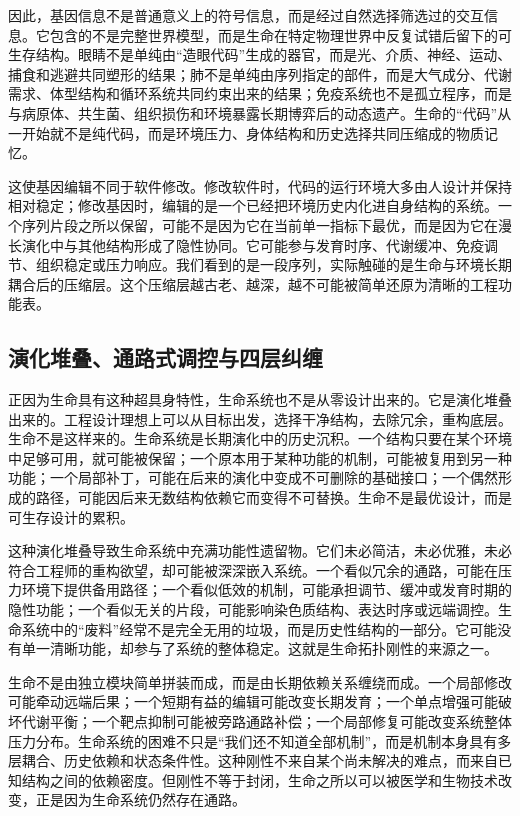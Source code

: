 因此，基因信息不是普通意义上的符号信息，而是经过自然选择筛选过的交互信息。它包含的不是完整世界模型，而是生命在特定物理世界中反复试错后留下的可生存结构。眼睛不是单纯由“造眼代码”生成的器官，而是光、介质、神经、运动、捕食和逃避共同塑形的结果；肺不是单纯由序列指定的部件，而是大气成分、代谢需求、体型结构和循环系统共同约束出来的结果；免疫系统也不是孤立程序，而是与病原体、共生菌、组织损伤和环境暴露长期博弈后的动态遗产。生命的“代码”从一开始就不是纯代码，而是环境压力、身体结构和历史选择共同压缩成的物质记忆。

这使基因编辑不同于软件修改。修改软件时，代码的运行环境大多由人设计并保持相对稳定；修改基因时，编辑的是一个已经把环境历史内化进自身结构的系统。一个序列片段之所以保留，可能不是因为它在当前单一指标下最优，而是因为它在漫长演化中与其他结构形成了隐性协同。它可能参与发育时序、代谢缓冲、免疫调节、组织稳定或压力响应。我们看到的是一段序列，实际触碰的是生命与环境长期耦合后的压缩层。这个压缩层越古老、越深，越不可能被简单还原为清晰的工程功能表。

\subsection{演化堆叠、通路式调控与四层纠缠}


正因为生命具有这种超具身特性，生命系统也不是从零设计出来的。它是演化堆叠出来的。工程设计理想上可以从目标出发，选择干净结构，去除冗余，重构底层。生命不是这样来的。生命系统是长期演化中的历史沉积。一个结构只要在某个环境中足够可用，就可能被保留；一个原本用于某种功能的机制，可能被复用到另一种功能；一个局部补丁，可能在后来的演化中变成不可删除的基础接口；一个偶然形成的路径，可能因后来无数结构依赖它而变得不可替换。生命不是最优设计，而是可生存设计的累积。

这种演化堆叠导致生命系统中充满功能性遗留物。它们未必简洁，未必优雅，未必符合工程师的重构欲望，却可能被深深嵌入系统。一个看似冗余的通路，可能在压力环境下提供备用路径；一个看似低效的机制，可能承担调节、缓冲或发育时期的隐性功能；一个看似无关的片段，可能影响染色质结构、表达时序或远端调控。生命系统中的“废料”经常不是完全无用的垃圾，而是历史性结构的一部分。它可能没有单一清晰功能，却参与了系统的整体稳定。这就是生命拓扑刚性的来源之一。

生命不是由独立模块简单拼装而成，而是由长期依赖关系缠绕而成。一个局部修改可能牵动远端后果；一个短期有益的编辑可能改变长期发育；一个单点增强可能破坏代谢平衡；一个靶点抑制可能被旁路通路补偿；一个局部修复可能改变系统整体压力分布。生命系统的困难不只是“我们还不知道全部机制”，而是机制本身具有多层耦合、历史依赖和状态条件性。这种刚性不来自某个尚未解决的难点，而来自已知结构之间的依赖密度。但刚性不等于封闭，生命之所以可以被医学和生物技术改变，正是因为生命系统仍然存在通路。

